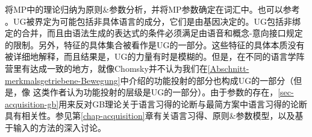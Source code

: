\citet[]{Chomsky2008a}将MP中的理论归纳为原则\&参数分析，并将MP参数确定在词汇中。也可以参考 。UG被界定为可能包括非具体语言的成分，它们是由基因决定的\citep[]{Chomsky2007a}。UG包括非绑定的合并，而且由语法生成的表达式的条件必须满足由语音和概念-意向接口规定的限制。另外，特征的具体集合被看作是UG的一部分\citep[--7]{Chomsky2007a}。这些特征的具体本质没有被详细地解释，而且结果是，UG的力量有时是模糊的。但是，在不同的语言学阵营里有达成一致的地方，就像Chomsky并不认为我们在\ref{Abschnitt-merkmalsgetriebene-Bewegung}中介绍的功能投射的部分也构成UG的一部分（但是，像 \citet{CR2010a}这类作者认为功能投射的层级是UG的一部分）。由于参数的存在，\ref{sec-acquisition-gb}用来反对GB理论关于语言习得的论断与最简方案中语言习得的论断具有相关性。参见第\ref{chap-acquisition}章有关语言习得、原则\&参数模型，以及基于输入的方法的深入讨论。

